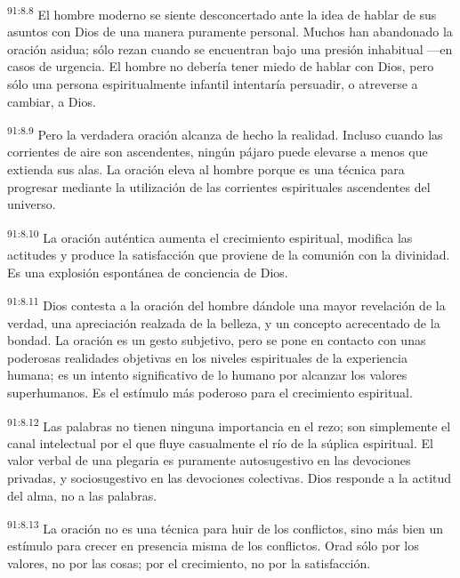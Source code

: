 \documentclass[twoside, 11pt]{book}
\begin{document}
\par
\textsuperscript{91:8.8} El hombre moderno se siente desconcertado ante la idea de hablar de sus asuntos con Dios de una manera puramente personal. Muchos han abandonado la oración asidua; sólo rezan cuando se encuentran bajo una presión inhabitual ---en casos de urgencia. El hombre no debería tener miedo de hablar con Dios, pero sólo una persona espiritualmente infantil intentaría persuadir, o atreverse a cambiar, a Dios.

\par
\textsuperscript{91:8.9} Pero la verdadera oración alcanza de hecho la realidad. Incluso cuando las corrientes de aire son ascendentes, ningún pájaro puede elevarse a menos que extienda sus alas. La oración eleva al hombre porque es una técnica para progresar mediante la utilización de las corrientes espirituales ascendentes del universo.

\par
\textsuperscript{91:8.10} La oración auténtica aumenta el crecimiento espiritual, modifica las actitudes y produce la satisfacción que proviene de la comunión con la divinidad. Es una explosión espontánea de conciencia de Dios.

\par
\textsuperscript{91:8.11} Dios contesta a la oración del hombre dándole una mayor revelación de la verdad, una apreciación realzada de la belleza, y un concepto acrecentado de la bondad. La oración es un gesto subjetivo, pero se pone en contacto con unas poderosas realidades objetivas en los niveles espirituales de la experiencia humana; es un intento significativo de lo humano por alcanzar los valores superhumanos. Es el estímulo más poderoso para el crecimiento espiritual.

\par
\textsuperscript{91:8.12} Las palabras no tienen ninguna importancia en el rezo; son simplemente el canal intelectual por el que fluye casualmente el río de la súplica espiritual. El valor verbal de una plegaria es puramente autosugestivo en las devociones privadas, y sociosugestivo en las devociones colectivas. Dios responde a la actitud del alma, no a las palabras.

\par
\textsuperscript{91:8.13} La oración no es una técnica para huir de los conflictos, sino más bien un estímulo para crecer en presencia misma de los conflictos. Orad sólo por los valores, no por las cosas; por el crecimiento, no por la satisfacción.
\end{document}
